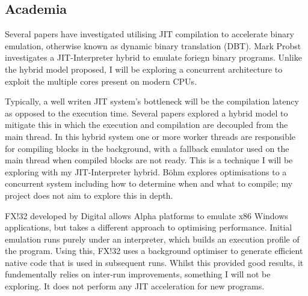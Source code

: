 \subsection{Academia}

Several papers have investigated utilising JIT compilation to accelerate binary emulation, otherwise known as dynamic binary translation (DBT). Mark Probst \cite{mark-probst-dbt} investigates a JIT-Interpreter hybrid to emulate foriegn binary programs. Unlike the hybrid model proposed, I will be exploring a concurrent architecture to exploit the multiple cores present on modern CPUs.

Typically, a well writen JIT system's bottleneck will be the compilation latency as opposed to the execution time. Several papers \cite{js-concurrent-trace, dynamic-compilation-early} explored a hybrid model to mitigate this in which the execution and compilation are decoupled from the main thread. In this hybrid system one or more worker threads are responsible for compiling blocks in the background, with a fallback emulator used on the main thread when compiled blocks are not ready. This is a technique I will be exploring with my JIT-Interpreter hybrid. Böhm \cite{igor-phd} explores optimisations to a concurrent system including how to determine when and what to compile; my project does not aim to explore this in depth.

FX!32 \cite{fx!32} developed by Digital allows Alpha platforms to emulate x86 Windows applications, but takes a different approach to optimising performance. Initial emulation runs purely under an interpreter, which builds an execution profile of the program. Using this, FX!32 uses a background optimiser to generate efficient native code that is used in subsequent runs. Whilst this provided good results, it fundementally relies on inter-run improvements, something I will not be exploring. It does not perform any JIT acceleration for new programs.